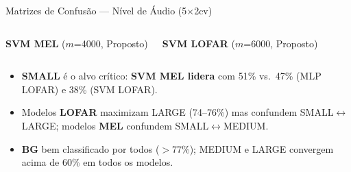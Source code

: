 \documentclass{beamer}
\begin{document}
\begin{frame}{Matrizes de Confusão — Nível de Áudio (5$\times$2cv)}
\begin{columns}[T]
        \centering \textbf{SVM MEL} ($m$=4000, Proposto) \\[0.1cm]

        \vspace{0.25cm}
        \centering \textbf{SVM LOFAR} ($m$=6000, Proposto) \\[0.1cm]

    \end{columns}

    \vspace{0.15cm}
    \begin{itemize}
        \item \textbf{SMALL} é o alvo crítico: \textbf{SVM MEL lidera} com 51\% vs.\ 47\% (MLP LOFAR) e 38\% (SVM LOFAR).
        \item Modelos \textbf{LOFAR} maximizam LARGE (74--76\%) mas confundem SMALL$\leftrightarrow$LARGE; modelos \textbf{MEL} confundem SMALL$\leftrightarrow$MEDIUM.
        \item \textbf{BG} bem classificado por todos ($>$77\%); MEDIUM e LARGE convergem acima de 60\% em todos os modelos.
    \end{itemize}
\end{frame}
\end{document}

